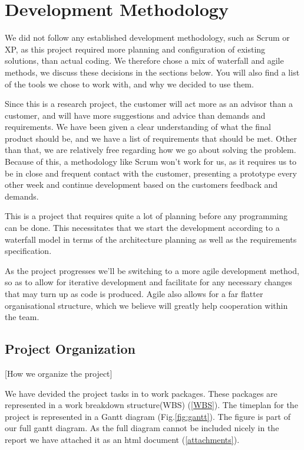     
\section{Development Methodology}\label{methodology} 
    We did not follow any established development methodology, such as Scrum or XP, as this project required more planning and configuration of existing solutions, than actual coding. We therefore chose a mix of waterfall and agile methods, we discuss these decisions in the sections below. You will also find a list of the tools we chose to work with, and why we decided to use them. 
    
    Since this is a research project, the customer will act more as an advisor than a customer, and will have more suggestions and advice than demands and requirements. We have been given a clear understanding of what the final product should be, and we have a list of requirements that should be met. Other than that, we are relatively free regarding how we go about solving the problem. Because of this, a methodology like Scrum won't work for us, as it requires us to be in close and frequent contact with the customer, presenting a prototype every other week and continue development based on the customers feedback and demands.
    
    This is a project that requires quite a lot of planning before any programming can be done. This necessitates that we start the development according to a waterfall model in terms of the architecture planning as well as the requirements specification.
    
    As the project progresses we’ll be switching to a more agile development method, so as to allow for iterative development and facilitate for any necessary changes that may turn up as code is produced. Agile also allows for a far flatter organisational structure, which we believe will greatly help cooperation within the team.

    \subsection{Project Organization}\label{projectorg}[How we organize the project]
    
    We have devided the project tasks in to work packages. These packages are represented in a work breakdown structure(WBS) (\ref{WBS}). The timeplan for the project is represented in a Gantt diagram (Fig.\ref{fig:gantt}). The figure is part of our full gantt diagram. As the full diagram cannot be included nicely in the report we have attached it as an html document (\ref{attachments}).
     
